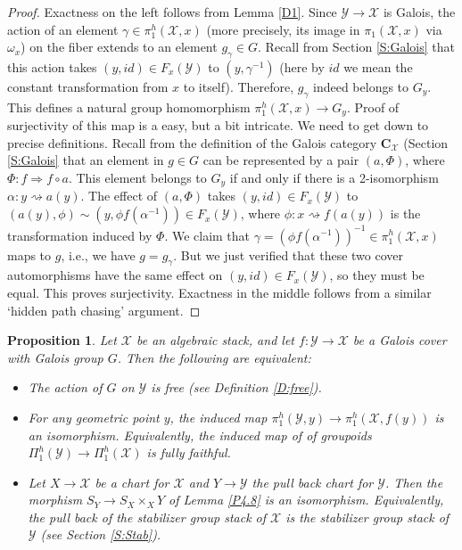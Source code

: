 \documentclass{amsart}
\newtheorem{prop}[thm]{Proposition}
\theoremstyle{definition}
\theoremstyle{remark}
\theoremstyle{remark}
\newcommand{\X}{\mathcal{X}}
\newcommand{\Y}{\mathcal{Y}}
\newcommand{\ox}{\omega_x}
\newcommand{\Ra}{\Rightarrow}
\newcommand{\rsa}{\rightsquigarrow}
\newcommand{\x}{\times}
\newcommand{\pX}{\pi_1(\X,x)}
\newcommand{\PhX}{\Pi_1^{h}(\X)}
\newcommand{\phX}{\pi_1^{h}(\X,x)}
\newcommand{\PhY}{\Pi_1^{h}(\Y)}
\newcommand{\phY}{\pi_1^{h}(\Y,y)}
\let\:=\colon
\begin{document}
\begin{proof}

Exactness on the left follows from Lemma \ref{D1}. Since $\Y \to
\X$ is Galois, the action of an element $\gamma \in \phX$ (more
precisely, its image in $\pX$ via $\ox$) on the fiber extends to
an element $g_{\gamma} \in G$. Recall from Section \ref{S:Galois}
that this action takes $(y, id) \in F_x(\Y)$ to $(y, \gamma^{-1})$
(here by $id$ we mean the constant transformation from $x$ to
itself). Therefore, $g_{\gamma}$ indeed belongs to $G_y$. This
defines a natural group homomorphism $\phX \to G_y$. Proof of
surjectivity of this map is a easy, but a bit intricate. We need
to get down to precise definitions. Recall from the definition of
the Galois category $\mathbf{C}_{\X}$ (Section \ref{S:Galois} that
an element in $g \in G$ can be represented by a pair $(a,\Phi)$,
where $\Phi \: f \Ra f \circ a$. This element belongs to $G_y$ if
and only if   there is a 2-isomorphism $\alpha \: y \rsa
a(y)$. The effect of $(a,\Phi)$ takes $(y, id) \in F_x(\Y)$ to
$(a(y), \phi) \sim (y,\phi f(\alpha^{-1})) \in F_x(\Y)$, where
$\phi \: x \rsa f(a(y))$ is the transformation induced by
$\Phi$. We claim that $\gamma=(\phi f(\alpha^{-1}))^{-1} \in \phX$
maps to $g$, i.e., we have $g=g_{\gamma}$. But we just verified
that these two cover automorphisms have the same effect on $(y,
id) \in F_x(\Y)$, so they must be equal.  This proves
surjectivity. Exactness in the middle follows from a similar
`hidden path chasing' argument.
\end{proof}

\begin{prop}
Let $\X$ be an algebraic stack, and let $f \: \Y \to \X$ be a
Galois cover with Galois group $G$. Then the following are
equivalent:

\begin{itemize}
\item[$\mathbf{i}$)] The action of $G$ on $\Y$ is free
(see Definition \ref{D:free}).

\item[$\mathbf{ii}$)] For any geometric point $y$, the induced
map $\phY \to \pi_1^h(\X,f(y))$ is an isomorphism. Equivalently,
the induced map of of groupoids $\PhY \to \PhX$ is fully faithful.

\item[$\mathbf{iii}$)] Let $X \to \X$ be a chart for $\X$ and
$Y \to \Y$ the pull back chart for $\Y$. Then the morphism $S_Y
\to S_X \x_X Y$ of Lemma \ref{P4.8} is an isomorphism.
Equivalently, the pull back of the stabilizer group stack of $\X$
is the stabilizer group stack of $\Y$ (see Section \ref{S:Stab}).
\end{itemize}
\end{prop}
\end{document}
